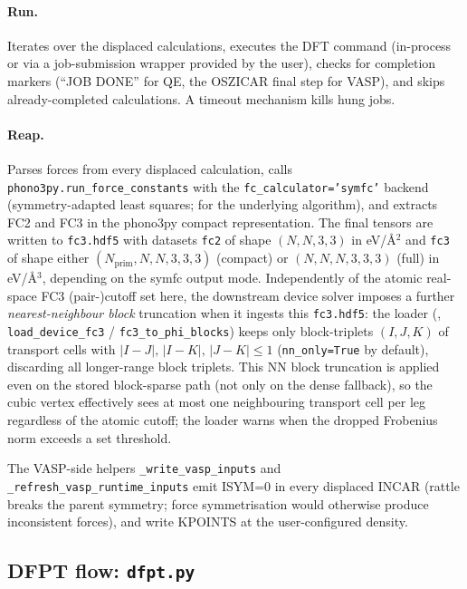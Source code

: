 \paragraph{Run.}  Iterates over the displaced calculations, executes
the DFT command (in-process or via a job-submission wrapper provided
by the user), checks for completion markers (``JOB DONE'' for QE,
the OSZICAR final step for VASP), and skips already-completed
calculations.  A timeout mechanism kills hung jobs.

\paragraph{Reap.}  Parses forces from every displaced calculation,
calls \texttt{phono3py.run\_force\_constants} with the
\texttt{fc\_calculator='symfc'} backend (symmetry-adapted least
squares; \cite{seko_projector-based_2024} for the underlying algorithm), and
extracts FC2 and FC3 in the phono3py compact representation.  The
final tensors are written to \texttt{fc3.hdf5} with datasets
\texttt{fc2} of shape $(N, N, 3, 3)$ in eV/\AA$^2$ and \texttt{fc3} of
shape either $(N_\mathrm{prim}, N, N, 3, 3, 3)$ (compact) or
$(N, N, N, 3, 3, 3)$ (full) in eV/\AA$^3$, depending on the symfc
output mode.
Independently of the atomic real-space FC3 (pair-)cutoff set here, the
downstream device solver imposes a further \emph{nearest-neighbour block}
truncation when it ingests this \texttt{fc3.hdf5}: the loader
(, \texttt{load\_device\_fc3} /
\texttt{fc3\_to\_phi\_blocks}) keeps only block-triplets $(I,J,K)$ of
transport cells with $|I-J|,\,|I-K|,\,|J-K| \leq 1$
(\texttt{nn\_only=True} by default), discarding all longer-range block
triplets.  This NN block truncation is applied even on the stored
block-sparse path (not only on the dense fallback), so the cubic vertex
effectively sees at most one neighbouring transport cell per leg
regardless of the atomic cutoff; the loader warns when the dropped
Frobenius norm exceeds a set threshold.

The VASP-side helpers \texttt{\_write\_vasp\_inputs} and
\texttt{\_refresh\_vasp\_runtime\_inputs} emit ISYM=0 in every
displaced INCAR (rattle breaks the parent symmetry; force
symmetrisation would otherwise produce inconsistent forces), and
write KPOINTS at the user-configured density.

\subsection{DFPT flow: \texttt{dfpt.py}}
\label{sec:dfpt_pkg}

